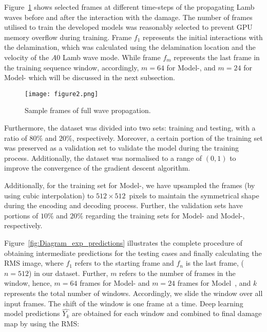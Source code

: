 \begin{sloppypar}
	Figure~\ref{fig:Full_wave} shows selected frames at different time-steps of the propagating Lamb waves before and after the interaction with the damage.
	The number of frames utilised to train the developed models was reasonably selected to prevent GPU memory overflow during training. 
	Frame \(f_{1}\) represents the initial interactions with the delamination, which was calculated using the delamination location and the velocity of the \(A0\) Lamb wave mode.
	While frame \(f_{m}\) represents the last frame in the training sequence window, accordingly, \(m=64\) for Model-, and \(m=24\) for Model- which will be discussed in the next subsection.
	\begin{figure}[!ht]
		\centering
		\texttt{[image: figure2.png]}
		\caption{Sample frames of full wave propagation.}
		\label{fig:Full_wave}
	\end{figure}

	Furthermore, the dataset was divided into two sets: training and testing, with a ratio of \(80\%\) and \(20\% \), respectively.
	Moreover, a certain portion of the training set was preserved as a validation set to validate the model during the training process.
	Additionally, the dataset was normalised to a range of \((0, 1)\) to improve the convergence of the gradient descent algorithm.

	Additionally, for the training set for Model-, we have upsampled the frames (by using cubic interpolation) to \(512\times512\)~pixels to maintain the symmetrical shape during the encoding and decoding process.
	Further, the validation sets have portions of \(10\%\) and \(20\%\) regarding the training sets for Model- and Model-, respectively.

	Figure~\ref{fig:Diagram_exp_predictions} illustrates the complete procedure of obtaining intermediate predictions for the testing cases and finally calculating the RMS image, where \(f_{1}\) refers to the starting frame and \(f_{n}\) is the last frame, (\(n=512\)) in our dataset.
	Further, \(m\) refers to the number of frames in the window, hence, \(m=64\) frames for Model- and \(m=24\) frames for Model~, and \(k\) represents the total number of windows.
	Accordingly, we slide the window over all input frames.
	The shift of the window is one frame at a time.
	Deep learning model predictions \(\hat{Y_k}\) are obtained for each window 
	and combined to final damage map by using the RMS\DIFaddbegin {}\DIFaddend :


\end{sloppypar}
